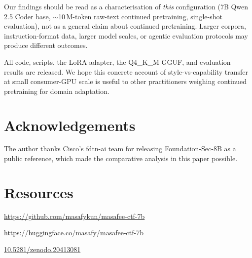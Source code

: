 \documentclass[10pt,twocolumn,a4paper]{article}
\begin{document}
Our findings should be read as a characterisation of \emph{this} configuration (7B Qwen 2.5 Coder base, $\sim$10\,M-token raw-text continued pretraining, single-shot evaluation), not as a general claim about continued pretraining. Larger corpora, instruction-format data, larger model scales, or agentic evaluation protocols may produce different outcomes.

All code, scripts, the LoRA adapter, the Q4{\_}K{\_}M GGUF, and evaluation results are released. We hope this concrete account of style-vs-capability transfer at small consumer-GPU scale is useful to other practitioners weighing continued pretraining for domain adaptation.

\section*{Acknowledgements}

The author thanks Cisco's fdtn-ai team for releasing Foundation-Sec-8B as a public reference, which made the comparative analysis in this paper possible.

\section*{Resources}

\begin{description}[leftmargin=0pt,labelindent=0pt]
\item[Code] \url{https://github.com/masafykun/masafee-ctf-7b}
\item[Model] \url{https://huggingface.co/masafy/masafee-ctf-7b}
\item[Archive (DOI)] \href{https://doi.org/10.5281/zenodo.20413081}{10.5281/zenodo.20413081}
\end{description}
\end{document}
